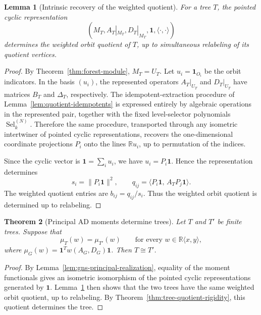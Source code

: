 \documentclass[a4paper,fleqn]{cas-sc}
\newtheorem{theorem}{Theorem}[section]
\newtheorem{lemma}[theorem]{Lemma}
\theoremstyle{definition}
\theoremstyle{remark}
\newcommand{\R}{\mathbb R}
\newcommand{\one}{\mathbf 1}
\newcommand{\Sel}{\operatorname{Sel}}
\begin{document}
\begin{lemma}[Intrinsic recovery of the weighted quotient]
\label{lem:intrinsic-weighted-quotient}
For a tree $T$, the pointed cyclic representation
\[
        (M_T,A_T|_{M_T},D_T|_{M_T},\one,\langle\cdot,\cdot\rangle)
\]
determines the weighted orbit quotient of $T$, up to simultaneous relabeling of
its quotient vertices.
\end{lemma}

\begin{proof}
By Theorem~\ref{thm:forest-module}, $M_T=U_T$.  Let
$u_i=\one_{O_i}$ be the orbit indicators.  In the basis $(u_i)$, the represented
operators $A_T|_{U_T}$ and $D_T|_{U_T}$ have matrices $B_T$ and $\Delta_T$,
respectively.  The idempotent-extraction procedure of
Lemma~\ref{lem:quotient-idempotents} is expressed entirely by algebraic
operations in the represented pair, together with the fixed level-selector
polynomials $\Sel_k^{(N)}$.  Therefore the same procedure, transported through
any isometric intertwiner of pointed cyclic representations, recovers the
one-dimensional coordinate projections $P_i$ onto the lines $\R u_i$, up to
permutation of the indices.

Since the cyclic vector is $\one=\sum_i u_i$, we have $u_i=P_i\one$.  Hence the
representation determines
\[
        s_i=\|P_i\one\|^2,
        \qquad
        q_{ij}=\langle P_i\one,\, A_T P_j\one\rangle .
\]
The weighted quotient entries are $b_{ij}=q_{ij}/s_i$.  Thus the weighted orbit
quotient is determined up to relabeling.
\end{proof}

\begin{theorem}[Principal AD moments determine trees]
\label{thm:principal-moments-determine-trees}
Let $T$ and $T'$ be finite trees.  Suppose that
\[
        \mu_T(w)=\mu_{T'}(w)
        \qquad\text{for every }w\in\mathbb R\langle x,y\rangle,
\]
where $\mu_G(w)=\one^T w(A_G,D_G)\one$.  Then $T\cong T'$.
\end{theorem}

\begin{proof}
By Lemma~\ref{lem:gns-principal-realization}, equality of the moment functionals gives
an isometric isomorphism of the pointed cyclic representations generated by
$\one$.  Lemma~\ref{lem:intrinsic-weighted-quotient} then shows that the two trees have
the same weighted orbit quotient, up to relabeling.  By
Theorem~\ref{thm:tree-quotient-rigidity}, this quotient determines the tree.
\end{proof}
\end{document}
